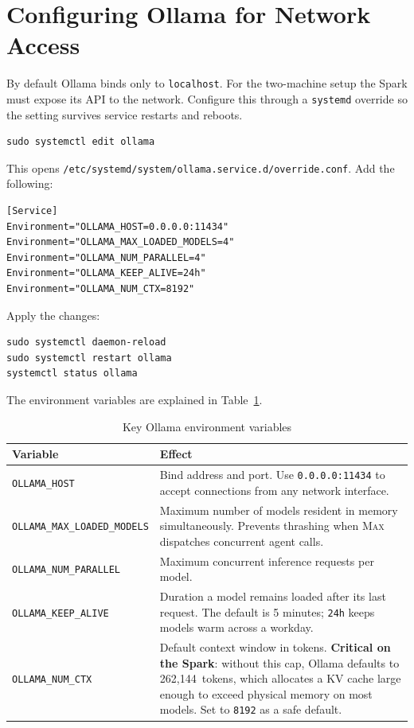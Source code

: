 \section{Configuring Ollama for Network Access}
\label{sec:network-config}

By default Ollama binds only to \texttt{localhost}. For the two-machine
setup the Spark must expose its API to the network. Configure this
through a \texttt{systemd} override so the setting survives service
restarts and reboots.

\begin{lstlisting}[style=bashstyle, caption={Create a systemd override on the Spark}]
sudo systemctl edit ollama
\end{lstlisting}

This opens \texttt{/etc/systemd/system/ollama.service.d/override.conf}.
Add the following:

\begin{lstlisting}[style=bashstyle, caption={Spark Ollama systemd override}]
[Service]
Environment="OLLAMA_HOST=0.0.0.0:11434"
Environment="OLLAMA_MAX_LOADED_MODELS=4"
Environment="OLLAMA_NUM_PARALLEL=4"
Environment="OLLAMA_KEEP_ALIVE=24h"
Environment="OLLAMA_NUM_CTX=8192"
\end{lstlisting}

Apply the changes:

\begin{lstlisting}[style=bashstyle]
sudo systemctl daemon-reload
sudo systemctl restart ollama
systemctl status ollama
\end{lstlisting}

The environment variables are explained in Table~\ref{tab:ollama-env}.

\begin{table}[h]
\centering
\caption{Key Ollama environment variables}
\label{tab:ollama-env}
\begin{tabular}{lp{9cm}}
\toprule
Variable & Effect \\
\midrule
\texttt{OLLAMA\_HOST} &
  Bind address and port. Use \texttt{0.0.0.0:11434} to accept connections
  from any network interface. \\
\texttt{OLLAMA\_MAX\_LOADED\_MODELS} &
  Maximum number of models resident in memory simultaneously. Prevents
  thrashing when \textsc{Max} dispatches concurrent agent calls. \\
\texttt{OLLAMA\_NUM\_PARALLEL} &
  Maximum concurrent inference requests per model. \\
\texttt{OLLAMA\_KEEP\_ALIVE} &
  Duration a model remains loaded after its last request. The default is
  5 minutes; \texttt{24h} keeps models warm across a workday. \\
\texttt{OLLAMA\_NUM\_CTX} &
  Default context window in tokens. \textbf{Critical on the Spark}: without
  this cap, Ollama defaults to 262,144~tokens, which allocates a KV cache
  large enough to exceed physical memory on most models. Set to
  \texttt{8192} as a safe default. \\
\bottomrule
\end{tabular}
\end{table}

